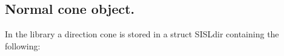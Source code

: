 

\subsection{Normal cone object.}

In the library a direction cone is stored in a struct SISLdir
containing the following:


\pgsbreak


